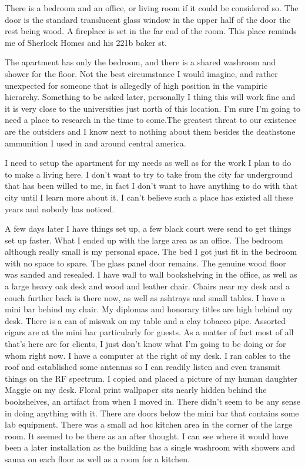 There is a bedroom and an office, or living room if it could be considered so. The door is the standard translucent glass window in the upper half of the door the rest being wood. A fireplace is set in the far end of the room. This place reminds me of Sherlock Homes and his 221b baker st.

The apartment has only the bedroom, and there is a shared washroom and shower for the floor. Not the best circumstance I would imagine, and rather unexpected for someone that is allegedly of high position in the vampiric hierarchy. Something to be asked later, personally I thing this will work fine and it is very close to the universities just north of this location. I’m sure I’m going to need a place to research in the time to come.The greatest threat to our existence are the outsiders and I know next to nothing about them besides the deathstone ammunition I used in and around central america.

I need to setup the apartment for my needs as well as for the work I plan to do to make a living here. I don’t want to try to take from the city far underground that has been willed to me, in fact I don’t want to have anything to do with that city until I learn more about it. I can’t believe such a place has existed all these years and nobody has noticed.

A few days later I have things set up, a few black court were send to get things set up faster. What I ended up with the large area as an office. The bedroom although really small is my personal space. The bed I got just fit in the bedroom with no space to spare. The glass panel door remains. The genuine wood floor was sanded and resealed. I have wall to wall bookshelving in the office, as well as a large heavy oak desk and wood and leather chair. Chairs near my desk and a couch further back is there now, as well as ashtrays and small tables. I have a mini bar behind my chair. My diplomas and honorary titles are high behind my desk. There is a can of miswak on my table and a clay tobacco pipe. Assorted cigars are at the mini bar particularly for guests. As a matter of fact most of all that’s here are for clients, I just don’t know what I’m going to be doing or for whom right now. I have a computer at the right of my desk. I ran cables to the roof and established some antennas so I can readily listen and even transmit things on the RF spectrum. I copied and placed a picture of my human daughter Maggie on my desk. Floral print wallpaper sits nearly hidden behind the bookshelves, an artifact from when I moved in. There didn’t seem to be any sense in doing anything with it. There are doors below the mini bar that contains some lab equipment. There was a small ad hoc kitchen area in the corner of the large room. It seemed to be there as an after thought. I can see where it would have been a later installation as the building has a single washroom with showers and sauna on each floor as well as a room for a kitchen.

